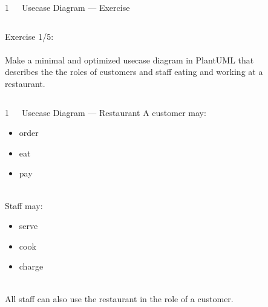 \documentclass{beamer}
\begin{document}
\begin{frame}{1~~~Usecase Diagram — Exercise}
\begin{columns}
\begin{column}{.35\textwidth}
Exercise 1/5:
\\\mbox{}\\
Make a minimal and optimized usecase diagram in PlantUML that describes the the roles of customers and staff eating and working at a restaurant.
\end{column}
\begin{column}{.65\textwidth}
\begin{figure}
\centering
{}
\end{figure}
\end{column}
\end{columns}
\end{frame}

\begin{frame}{1~~~Usecase Diagram — Restaurant}
A customer \alert{may}:
\begin{itemize}
\item order
\item eat
\item pay
\end{itemize}
\mbox{}\\
Staff \alert{may}:
\begin{itemize}
\item serve
\item cook
\item charge
\end{itemize}
\mbox{}\\
All staff \alert{can also use} the restaurant in the \alert{role} of a customer.
\end{frame}
\end{document}
